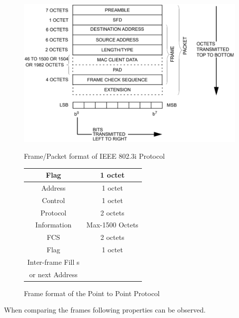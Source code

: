 \documentclass[a4paper,11pt]{article}%
\begin{document}
 
\begin{figure}[!hbt]
	\begin{minipage}[c]{0.35\linewidth}
		\centering
		\includegraphics[scale=0.45]{figures/framformat}
		\caption{Frame/Packet format of IEEE 802.3i Protocol\cite{main}}
	\end{minipage}\hfill
	\begin{minipage}[c]{0.35\linewidth}
		\centering
				\begin{tabular}{|c|c|}
				\hline
				Flag & 	1 octet\\\hline
				Address & 1 octet\\\hline
				Control & 1 octet\\\hline
				Protocol & 2 octets\\\hline
				Information& Max-1500 Octets\\\hline
				FCS & 2 octets\\\hline
				Flag & 1 octet\\\hline
				Inter-frame Fill s& \\
				or next Address & \\\hline
				\end{tabular}
		\caption{Frame format of the Point to Point Protocol\cite{ppp}}
	\end{minipage}
\end{figure} 

When comparing the frames following properties can be observed.
\end{document}

